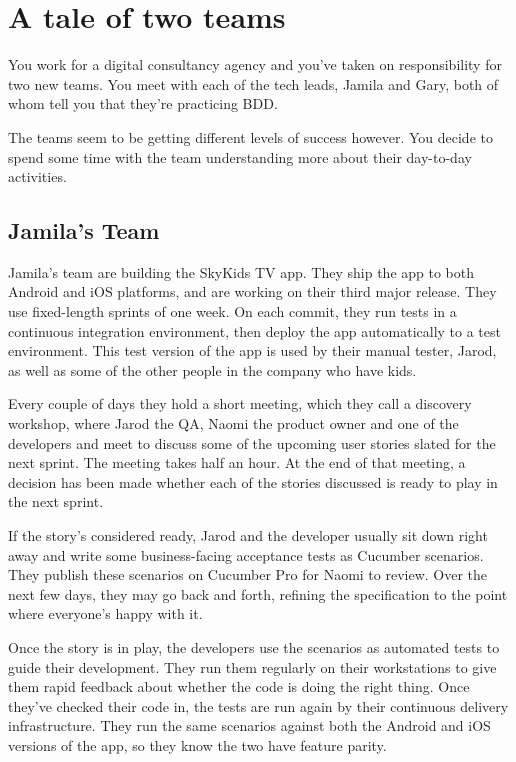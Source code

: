 \chapter*{A tale of two teams}

You work for a digital consultancy agency and you've taken on responsibility for two new teams. You meet with each of the tech leads, Jamila and Gary, both of whom tell you that they're practicing BDD.

The teams seem to be getting different levels of success however. You decide to spend some time with the team understanding more about their day-to-day activities.

\section*{Jamila's Team}

Jamila's team are building the SkyKids TV app. They ship the app to both Android and iOS platforms, and are working on their third major release. They use fixed-length sprints of one week. On each commit, they run tests in a continuous integration environment, then deploy the app automatically to a test environment. This test version of the app is used by their manual tester, Jarod, as well as some of the other people in the company who have kids.

Every couple of days they hold a short meeting, which they call a discovery workshop, where Jarod the QA, Naomi the product owner and one of the developers and meet to discuss some of the upcoming user stories slated for the next sprint. The meeting takes half an hour. At the end of that meeting, a decision has been made whether each of the stories discussed is ready to play in the next sprint.

If the story’s considered ready, Jarod and the developer usually sit down right away and write some business-facing acceptance tests as Cucumber scenarios. They publish these scenarios on Cucumber Pro for Naomi to review. Over the next few days, they may go back and forth, refining the specification to the point where everyone’s happy with it.

Once the story is in play, the developers use the scenarios as automated tests to guide their development. They run them regularly on their workstations to give them rapid feedback about whether the code is doing the right thing. Once they’ve checked their code in, the tests are run again by their continuous delivery infrastructure. They run the same scenarios against both the Android and iOS versions of the app, so they know the two have feature parity.

